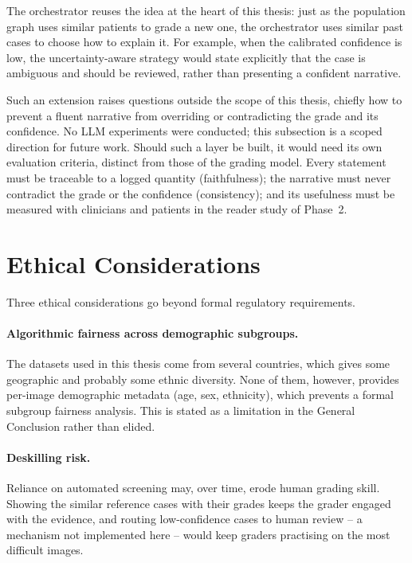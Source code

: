 The orchestrator reuses the idea at the heart of this thesis: just as the population graph
uses similar patients to grade a new one, the orchestrator uses similar past cases to
choose how to explain it. For example, when the calibrated confidence is low, the
uncertainty-aware strategy would state explicitly that the case is ambiguous and should be
reviewed, rather than presenting a confident narrative.

Such an extension raises questions outside the scope of this thesis, chiefly how to
prevent a fluent narrative from overriding or contradicting the grade and its confidence.
No LLM experiments were conducted; this subsection is a scoped direction for future work.
Should such a layer be built, it would need its own evaluation criteria, distinct from
those of the grading model. Every statement must be traceable to a logged quantity
(faithfulness); the narrative must never contradict the grade or the confidence
(consistency); and its usefulness must be measured with clinicians and patients in the
reader study of Phase~2.

\section{Ethical Considerations}
\label{sec:ethics}

Three ethical considerations go beyond formal regulatory requirements.

\paragraph{Algorithmic fairness across demographic subgroups.}
The datasets used in this thesis come from several countries, which gives some
geographic and probably some ethnic diversity. None of them, however, provides per-image
demographic metadata (age, sex, ethnicity), which prevents a formal subgroup fairness
analysis. This is stated as a limitation in the General Conclusion rather than elided.

\paragraph{Deskilling risk.}
Reliance on automated screening may, over time, erode human grading skill. Showing the
similar reference cases with their grades keeps the grader engaged with the evidence,
and routing low-confidence cases to human review -- a mechanism not implemented here --
would keep graders practising on the most difficult images.

